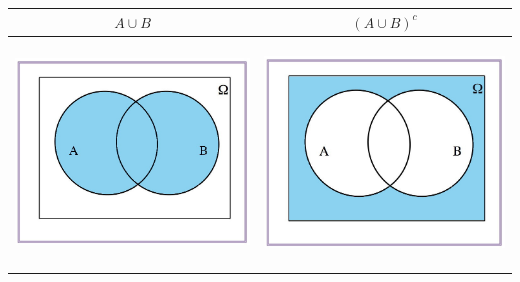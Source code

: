 \documentclass[]{book}
\begin{document}
\begin{longtable}[]{@{}cc@{}}
\toprule
\(A\cup B\) & \((A\cup B)^c\)\tabularnewline
\midrule
\endhead
\includegraphics[width=\textwidth,height=6cm]{Images/proba1dibujos/demorgan6.jpg} & \includegraphics[width=\textwidth,height=6cm]{Images/proba1dibujos/demorgan7.jpg}\tabularnewline
\bottomrule
\end{longtable}
\end{document}
